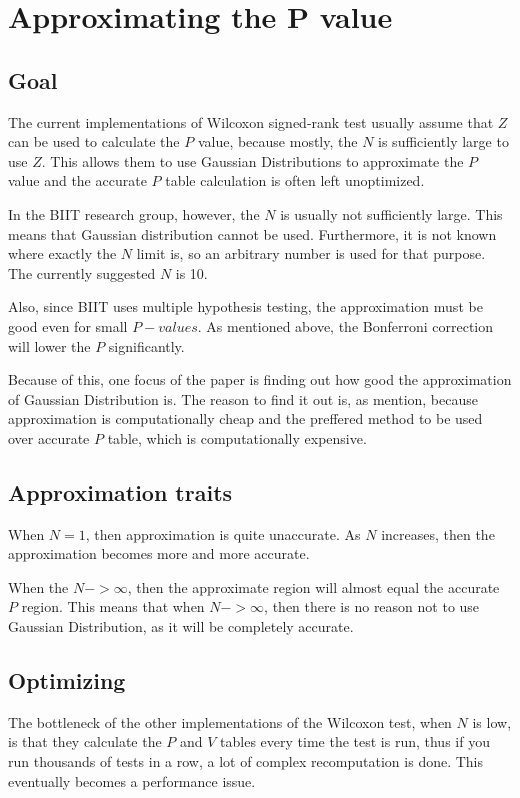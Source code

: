 \documentclass[12pt]{article}
\begin{document}
\newpage

\section{Approximating the P value}

\subsection{Goal}
The current implementations of Wilcoxon signed-rank test usually assume that $Z$ can be used to calculate the $P$ value, because mostly, the $N$ is sufficiently large to use $Z$.
This allows them to use Gaussian Distributions to approximate the $P$ value and the accurate $P$ table calculation is often left unoptimized.

In the BIIT research group, however, the $N$ is usually not sufficiently large. This means that Gaussian distribution cannot be used. Furthermore, it is not known where exactly the $N$ limit is, so an arbitrary number is used for that purpose. The currently suggested $N$ is 10.

Also, since BIIT uses multiple hypothesis testing, the approximation must be good even for small $P-values$. As mentioned above, the Bonferroni correction will lower the $P$ significantly.

Because of this, one focus of the paper is finding out how good the approximation of Gaussian Distribution is. The reason to find it out is, as mention, because approximation is computationally cheap and the preffered method to be used over accurate $P$ table, which is computationally expensive.

\subsection{Approximation traits}
When $N = 1$, then approximation is quite unaccurate. As $N$ increases, then the approximation becomes more and more accurate.

When the $N->\infty$, then the approximate region will almost equal the accurate $P$ region. This means that when $N->\infty$, then there is no reason not to use Gaussian Distribution, as it will be completely accurate.

\subsection{Optimizing}

The bottleneck of the other implementations of the Wilcoxon test, when $N$ is low, is that they calculate the $P$ and $V$ tables every time the test is run, thus if you run thousands of tests in a row, a lot of complex recomputation is done. This eventually becomes a performance issue.
\end{document}
